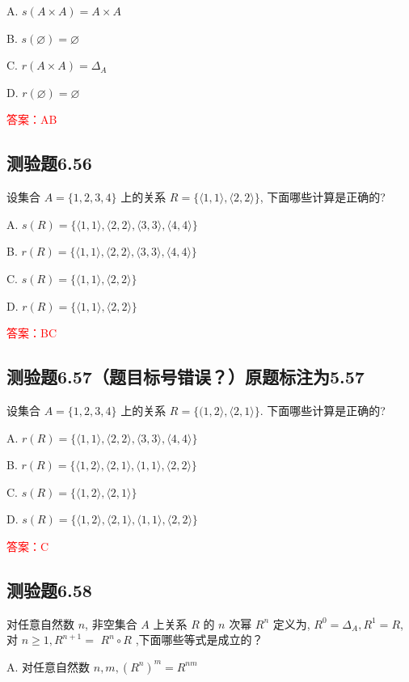 \documentclass[UTF8, heading=true]{ctexart}
\begin{document}
A. $s(A \times A)=A \times A$

B. $s(\varnothing)=\varnothing$

C. $r(A \times A)=\Delta_A$

D. $r(\varnothing)=\varnothing$

\textcolor{red}{答案：AB}

\subsection{测验题6.56}

设集合 $A=\{1,2,3,4\}$ 上的关系 $R=\{\langle 1,1\rangle,\langle 2,2\rangle\}$, 下面哪些计算是正确的?

A. $s(R)=\{\langle 1,1\rangle,\langle 2,2\rangle,\langle 3,3\rangle,\langle 4,4\rangle\}$

B. $r(R)=\{\langle 1,1\rangle,\langle 2,2\rangle,\langle 3,3\rangle,\langle 4,4\rangle\}$

C. $s(R)=\{\langle 1,1\rangle,\langle 2,2\rangle\}$

D. $r(R)=\{\langle 1,1\rangle,\langle 2,2\rangle\}$

\textcolor{red}{答案：BC}

\subsection{测验题6.57（题目标号错误？）原题标注为5.57}
设集合 $A=\{1,2,3,4\}$ 上的关系 $R=\{(1,2\rangle,\langle 2,1\rangle\}$. 下面哪些计算是正确的?

A. 
$
r(R)=\{\langle 1,1\rangle,\langle 2,2\rangle,\langle 3,3\rangle,\langle 4,4\rangle\}
$

B. 
$
r(R)=\{\langle 1,2\rangle,\langle 2,1\rangle,\langle 1,1\rangle,\langle 2,2\rangle\}
$

C. 
$
s(R)=\{\langle 1,2\rangle,\langle 2,1\rangle\}
$

D. 
$
s(R)=\{\langle 1,2\rangle,\langle 2,1\rangle,\langle 1,1\rangle,\langle 2,2\rangle\}
$

\textcolor{red}{答案：C}

\subsection{测验题6.58}

对任意自然数 $n$, 非空集合 $A$ 上关系 $R$ 的 $n$ 次幂 $R^n$ 定义为, $R^0=\Delta_A, R^1=R$, 对 $n \geq 1, R^{n+1}=$
$R^n \circ R$ ,下面哪些等式是成立的？

A. 对任意自然数 $n, m,\left(R^n\right)^m=R^{n m}$
\end{document}
